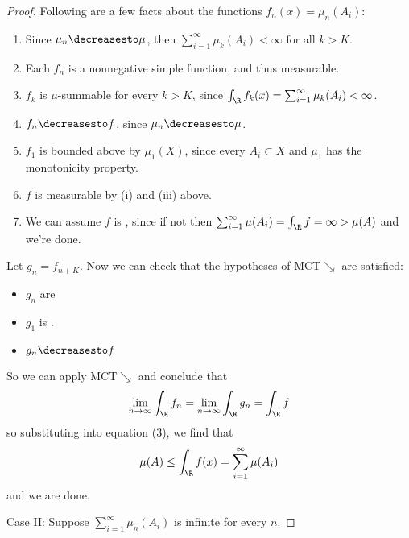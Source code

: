 \documentclass[12pt,letterpaper]{article}
\begin{document}
\begin{enumerate}
\begin{proof}
Following are a few facts about the functions $f_n(x)=\mu_n(A_i)$:
	\begin{enumerate}[label=(\roman*)]
	\item Since $\mu_n\decreasesto\mu$, then $\sum_{i=1}^\infty\mu_k(A_i)<\infty$ for all $k>K$.
	\item Each $f_n$ is a nonnegative simple function, and thus measurable.  
	\item $f_k$ is $\mu$-summable for every $k>K$, since $\int_\R f_k(x)=\sum_{i=1}^\infty\mu_k(A_i)<\infty$. 
	\item $f_n\decreasesto f$, since $\mu_n\decreasesto\mu$. 
	\item $f_1$ is bounded above by $\mu_1(X)$, since every $A_i\subset X$ and $\mu_1$ has the monotonicity property. 
	\item $f$ is measurable by (i) and (iii) above. 
	\item We can assume $f$ is \musummable{}, since if not then $\sum_{i=1}^\infty\mu(A_i)=\int_\R f=\infty>\mu(A)$ and we're done. 
	\end{enumerate}
Let $g_n=f_{n+K}$. Now we can check that the hypotheses of MCT$\searrow$ are satisfied:
	\begin{itemize}
	\item $g_n$ are \mumeasurable{}
	\item $g_1$ is \musummable{}. 
	\item $g_n\decreasesto f$
	\end{itemize}
So we can apply MCT$\searrow$ and conclude that 
$$\lim_{n\to\infty}\int_\R f_n = \lim_{n\to\infty}\int_\R g_n = \int_\R f$$ 
so substituting into equation (3), we find that 
$$\mu(A)\leq\int_\R f(x)= \sum_{i=1}^\infty\mu(A_i)$$
and we are done.


Case II: Suppose $\sum_{i=1}^\infty\mu_n(A_i)$ is infinite for every $n$.


\end{proof}
\end{enumerate}
\end{document}
